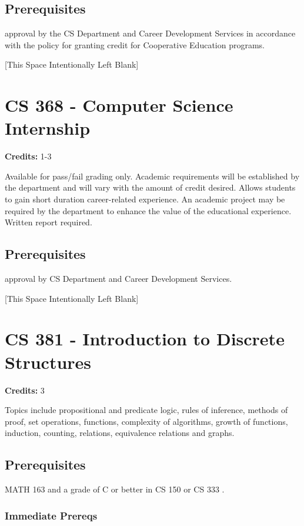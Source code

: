 \documentclass[]{article}
\newcommand{\pagebreakhere}{
\vspace*{\fill}
\begin{center}
[This Space Intentionally Left Blank]
\end{center}
\vspace*{\fill}
\newpage
}
\begin{document}
\subsection{Prerequisites}\label{prerequisites-20}

approval by the CS Department and Career Development Services in
accordance with the policy for granting credit for Cooperative Education
programs.

\pagebreakhere
\section{CS 368 - Computer Science
Internship}\label{cs-368---computer-science-internship}

\textbf{Credits:} 1-3

Available for pass/fail grading only. Academic requirements will be
established by the department and will vary with the amount of credit
desired. Allows students to gain short duration career-related
experience. An academic project may be required by the department to
enhance the value of the educational experience. Written report
required.

\subsection{Prerequisites}\label{prerequisites-21}

approval by CS Department and Career Development Services.

\pagebreakhere
\section{CS 381 - Introduction to Discrete
Structures}\label{cs-381---introduction-to-discrete-structures}

\textbf{Credits:} 3

Topics include propositional and predicate logic, rules of inference,
methods of proof, set operations, functions, complexity of algorithms,
growth of functions, induction, counting, relations, equivalence
relations and graphs.

\subsection{Prerequisites}\label{prerequisites-22}

MATH 163 and a grade of C or better in CS 150 or CS 333 .

\subsubsection{Immediate Prereqs}\label{immediate-prereqs-15}
\end{document}
